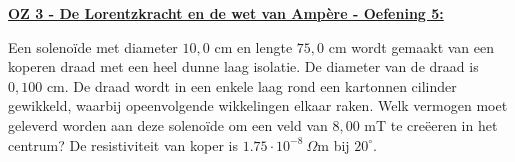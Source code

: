 \textbf{\underline{OZ 3 - De Lorentzkracht en de wet van Ampère - Oefening 5:}}
\vspace{0.5cm}

Een solenoïde met diameter $10,0$ cm en lengte $75,0$ cm wordt gemaakt van een koperen
draad met een heel dunne laag isolatie. De diameter van de draad is $0,100$ cm.
De draad wordt in een enkele laag rond een kartonnen cilinder gewikkeld, waarbij
opeenvolgende wikkelingen elkaar raken. Welk vermogen moet geleverd worden aan
deze solenoïde om een veld van $8,00$ mT te creëeren in het centrum? De resistiviteit
van koper is $1.75 \cdot 10^{-8} \ \Omega$m bij $20^\circ$.


